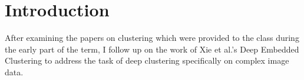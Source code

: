 \section{Introduction}

After examining the papers on clustering which were provided to the class during the early part of the term, I follow up on the work of Xie et al.'s Deep Embedded Clustering \cite{xie2016unsupervised} to address the task of deep clustering specifically on complex image data.

